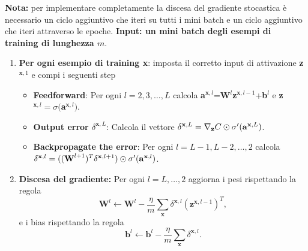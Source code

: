 \textbf{Nota:} per implementare completamente la discesa del gradiente stocastica è necessario un ciclo aggiuntivo che iteri su tutti i mini batch e un ciclo aggiuntivo che iteri attraverso le epoche.
\newline
\textbf{Input: un mini batch degli esempi di training di lunghezza $m$}. 
\begin{enumerate}
    \item \textbf{Per ogni esempio di training x}: imposta il corretto input di attivazione \textbf{z}$^{\textbf{x},1}$ e compi i seguenti step
    \begin{itemize}
        \item \textbf{Feedforward}: Per ogni $l=2,3,\dots,L$ calcola \textbf{a}$^{\textbf{x},l}$=\textbf{W}$^l$\textbf{z}$^{\textbf{x},l-1}$+\textbf{b}$^l$ e \textbf{z}$^{\textbf{x},l}=\sigma($\textbf{a}$^{\textbf{x},l})$.
        \item \textbf{Output error $\delta^{\textbf{x},L}$}: Calcola il vettore $\delta^{\textbf{x},L}=\nabla_\text{\textbf{z}}C\odot\sigma'(\text{\textbf{a}}^{\textbf{x},L})$.
        \item \textbf{Backpropagate the error}: 
        Per ogni $l=L-1,L-2,\dots,2$ calcola $\delta^{\textbf{x},l}=((\text{\textbf{W}}^{l+1})^T \delta^{\textbf{x},l+1})\odot\sigma'(\text{\textbf{a}}^{\textbf{x},l})$.
    \end{itemize}
    \item \textbf{Discesa del gradiente:} Per ogni $l=L,\dots,2$ aggiorna i pesi rispettando la regola 
    \begin{equation}
        \textbf{W}^l\leftarrow\textbf{W}^l-\frac{\eta}{m}\sum_\textbf{x}\delta^{\textbf{x},l}(\textbf{z}^{\textbf{x},l-1})^T, 
    \end{equation}
    e i bias rispettando la regola 
    \begin{equation}
        \textbf{b}^l\leftarrow\textbf{b}^l-\frac{\eta}{m}\sum_\textbf{x}\delta^{\textbf{x},l}.
    \end{equation}
\end{enumerate}
\newpage
